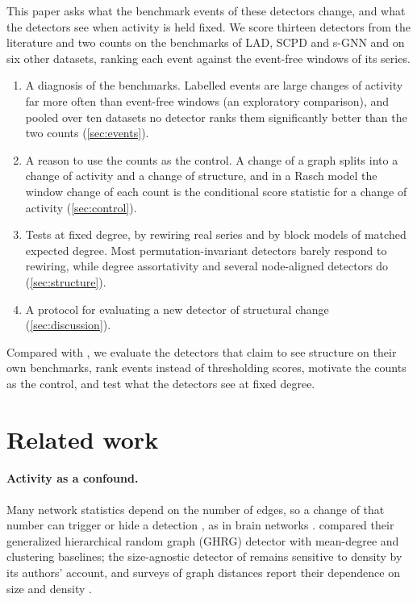 \documentclass[11pt]{article}
\theoremstyle{dsplain}
\theoremstyle{definition}
\begin{document}
This paper asks what the benchmark events of these detectors change, and what the detectors see when
activity is held fixed. We score thirteen detectors from the literature and two counts on the benchmarks of LAD,
SCPD and s-GNN and on six other datasets, ranking each event against the event-free windows of its series.
\begin{enumerate}[leftmargin=*,itemsep=1pt,topsep=2pt]
  \item A diagnosis of the benchmarks. Labelled events are large changes of activity far more often than
  event-free windows (an exploratory comparison), and pooled over ten datasets no detector ranks them
  significantly better than the two counts (\cref{sec:events}).
  \item A reason to use the counts as the control. A change of a graph splits into a change of activity
  and a change of structure, and in a Rasch model the window change of each count is the conditional score
  statistic for a change of activity (\cref{sec:control}).
  \item Tests at fixed degree, by rewiring real series and by block models of matched expected degree. Most
  permutation-invariant detectors barely respond to rewiring, while degree assortativity and several
  node-aligned detectors do (\cref{sec:structure}).
  \item A protocol for evaluating a new detector of structural change (\cref{sec:discussion}).
\end{enumerate}
Compared with \citet{kendrick2018change}, we evaluate the detectors that claim to see structure on their
own benchmarks, rank events instead of thresholding scores, motivate the counts as the control, and
test what the detectors see at fixed degree.

\section{Related work}
\label{sec:related}

\paragraph{Activity as a confound.} Many network statistics depend on the number of edges, so a change of
that number can trigger or hide a detection \citep{lafond2014anomaly,lafond2018designing}, as in brain
networks \citep{vanwijk2010comparing}. \citet{peel2015detecting} compared their generalized hierarchical
random graph (GHRG) detector with mean-degree and clustering baselines; the size-agnostic detector of
\citet{miller2020size} remains sensitive to density by its authors' account, and surveys of graph
distances report their dependence on size and density
\citep{donnat2018tracking,wills2020metrics,hartle2020network}.
\end{document}
